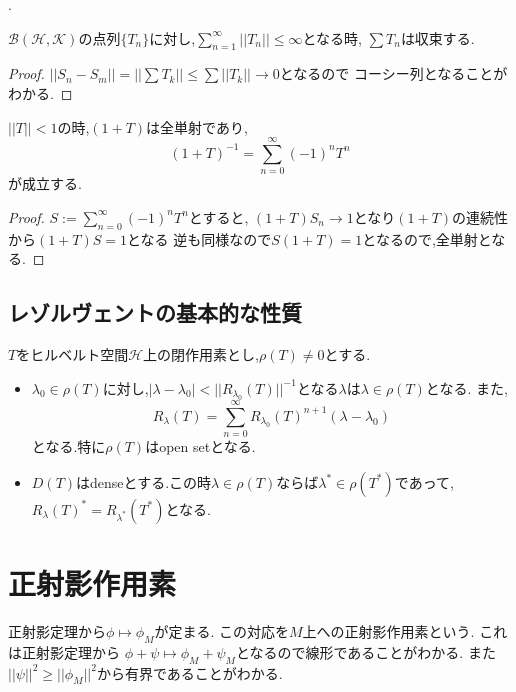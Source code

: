 \documentclass[uplatex]{jsbook}
\begin{document}
.

\begin{prop}
 $\mathcal{B} (\mathcal{H}, \mathcal{K})$の点列$\{T_n\}$に対し,$\sum_{n=1}^{\infty}||T_n|| \le \infty$となる時,
 $\sum T_n$は収束する.
\end{prop}
\begin{proof}
$||S_n - S_m|| =|| \sum T_k|| \le \sum ||T_k|| \to 0$となるので
コーシー列となることがわかる.
\end{proof}

\begin{thm}
$||T|| < 1$の時,$(1+T)$は全単射であり,
\begin{equation*}
 (1+T)^{-1}  = \sum_{n=0}^{\infty} (-1)^{n}T ^{n}
\end{equation*}
が成立する.
\end{thm}
\begin{proof}
 $S:= \sum_{n=0}^{\infty} (-1)^{n}T ^{n}$とすると,
$(1+T)S_n \to 1$となり$(1+T)$の連続性から$(1+T)S = 1$となる
逆も同様なので$S(1+T)=1$となるので,全単射となる.
\end{proof}

\subsection{レゾルヴェントの基本的な性質}
\begin{thm}
 $T$をヒルベルト空間$\mathcal{H}$上の閉作用素とし,$\rho(T) \neq 0$とする.
 \begin{itemize}
   \item $\lambda_0 \in \rho(T)$に対し,$|\lambda - \lambda_0|< ||R_{\lambda_0}(T) ||^{-1}$となる$\lambda$は$\lambda \in \rho(T)$となる.
   また,
   \begin{equation*}
   R_{\lambda}(T) = \sum_{n=0} ^{\infty} R_{\lambda_0}(T)^{n+1}(\lambda - \lambda_0)
   \end{equation*}
   となる.特に$\rho(T)$はopen setとなる.
   \item $D(T)$はdenseとする.この時$\lambda \in \rho(T)$ならば$\lambda^* \in \rho(T^*)$であって,$R_{\lambda}(T)^* = R_{\lambda^*}(T^*)$となる.
 \end{itemize}
\end{thm}


\section{正射影作用素}
正射影定理から$\phi \mapsto \phi_M$が定まる.
この対応を$M$上への正射影作用素という.
これは正射影定理から
$\phi + \psi \mapsto \phi_M + \psi_M$となるので線形であることがわかる.
また$||\psi||^2 \ge ||\phi_M||^2$から有界であることがわかる.
\end{document}
